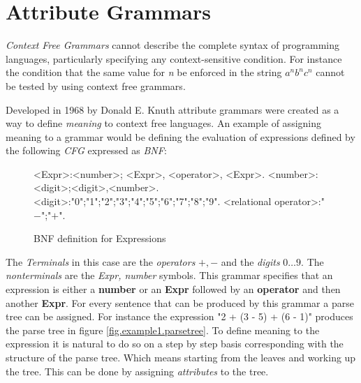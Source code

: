 \chapter{Attribute Grammars}
\emph{Context Free Grammars} cannot describe the complete syntax of programming languages\cite{knuth1}, particularly specifying any context-sensitive condition. For instance the condition that the same value for \emph{n} be enforced in the string $a^nb^nc^n$ cannot be tested by using context free grammars\cite{ken}.

Developed in 1968 by Donald E. Knuth attribute grammars were created as a way to define \emph{meaning} to context free languages. An example of assigning meaning to a grammar would be defining the evaluation of expressions defined by the following \emph{CFG} expressed as \emph{BNF}:

\begin{figure}[H]
\begin{grammar}
<Expr>:<number>; <Expr>, <operator>, <Expr>.
<number>:<digit>;<digit>,<number>.
<digit>:"0";"1";"2";"3";"4";"5";"6";"7";"8";"9".
<relational operator>:"$-$";"$+$".
\end{grammar}
\caption{BNF definition for Expressions}
\label{grammar:bnf:expr}
\end{figure}

The \emph{Terminals} in this case are the \emph{operators} $+,-$ and the \emph{digits} $0\ldots 9$. The \emph{nonterminals} are the \emph{Expr, number} symbols. This grammar specifies that an expression is either a \textbf{number} or an \textbf{Expr} followed by an \textbf{operator} and then another \textbf{Expr}. For every sentence that can be produced by this grammar a parse tree can be assigned. For instance the expression "2 + (3 - 5) + (6 - 1)" produces the parse tree in figure \ref{fig.example1.parsetree}. To define meaning to the expression it is natural to do so on a step by step basis corresponding with the structure of the parse tree. Which means starting from the leaves and working up the tree. This can be done by assigning \emph{attributes} to the tree.

